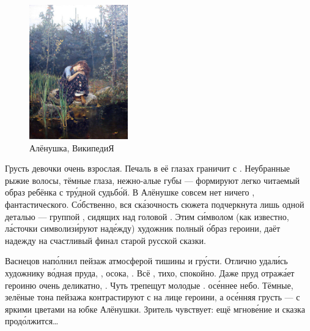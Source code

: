 \begin{figure}
    \begin{center}
        \includegraphics[width=0.38\textwidth]{img/alyonushka.jpg}
    \end{center}
    \caption{Алёнушка, ВикипедиЯ}
\end{figure}
Грусть девочки очень взрослая. Печаль в её глазах граничит с . Неубранные рыжие волосы, тёмные глаза, нежно-алые губы --- формируют легко читаемый образ ребёнка с тр\'{у}дной судьб\'{о}й.
В Алёнушке совсем нет ничего , фантастического.
С\'{о}бственно, вся ск\'{а}зочность сюжета подчеркнута лишь одной деталью --- группой , сидящих над головой . Этим с\'{и}мволом (как известно, л\'{а}сточки символиз\'{и}руют над\'{е}жду) художник  полный  \'{о}браз героини, даёт надежду на счастливый финал старой русской сказки.

Васнецов нап\'{о}лнил  пейзаж атмосферой тишины и гр\'{у}сти.
Отлично удал\'{и}сь художнику в\'{о}дная  пруда, , осока, .
Всё , тихо, спокойно.
Даже пруд отраж\'{а}ет героиню очень деликатно, .
Чуть трепещут молодые .   ос\'{е}ннее небо.
Тёмные, зелёные тона пейзажа контрастируют с  на лице героини, а ос\'{е}нняя грусть --- с яркими цветами на юбке Алёнушки. Зритель чувствует: ещё мгнов\'{е}ние и сказка прод\'{о}лжится\dots







